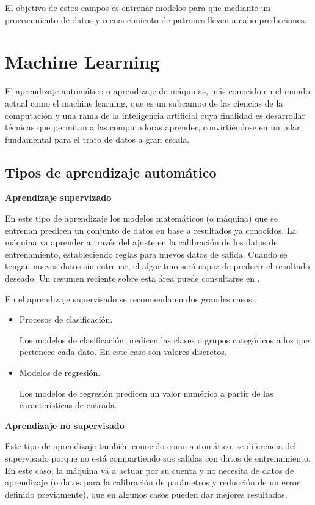 \documentclass[
  us-letterpaper,
]{scrreprt}
\theoremstyle{plain}
\theoremstyle{definition}
\theoremstyle{definition}
\theoremstyle{remark}
\begin{document}
El objetivo de estos campos es entrenar modelos para que mediante un
procesamiento de datos y reconocimiento de patrones lleven a cabo
predicciones.

\section{Machine Learning}\label{machine-learning}

El aprendizaje automático o aprendizaje de máquinas, más conocido en el
mundo actual como el machine learning, que es un subcampo de las
ciencias de la computación y una rama de la inteligencia artificial cuya
finalidad es desarrollar técnicas que permitan a las computadoras
aprender, convirtiéndose en un pilar fundamental para el trato de datos
a gran escala.

\subsection{Tipos de aprendizaje
automático}\label{tipos-de-aprendizaje-automuxe1tico}

\textbf{Aprendizaje supervizado}

En este tipo de aprendizaje los modelos matemáticos (o máquina) que se
entrenan predicen un conjunto de datos en base a resultados ya
conocidos. La máquina va aprender a través del ajuste en la calibración
de los datos de entrenamiento, estableciendo reglas para nuevos datos de
salida. Cuando se tengan nuevos datos sin entrenar, el algoritmo será
capaz de predecir el resultado deseado. Un resumen reciente sobre esta
área puede consultarse en \textcite{burkart2021survey} .

En el aprendizaje supervisado se recomienda en dos grandes casos :

\begin{itemize}
\item
  Procesos de clasificación.

  Los modelos de clasificación predicen las clases o grupos categóricos
  a los que pertenece cada dato. En este caso son valores discretos.
\item
  Modelos de regresión.

  Los modelos de regresión predicen un valor numérico a partir de las
  características de entrada.
\end{itemize}

\textbf{Aprendizaje no supervisado}

Este tipo de aprendizaje también conocido como automático, se diferencia
del supervisado porque no está compartiendo sus salidas con datos de
entrenamiento. En este caso, la máquina vá a actuar por su cuenta y no
necesita de datos de aprendizaje (o datos para la calibración de
parámetros y reducción de un error definido previamente), que en algunos
casos pueden dar mejores resultados.
\end{document}
